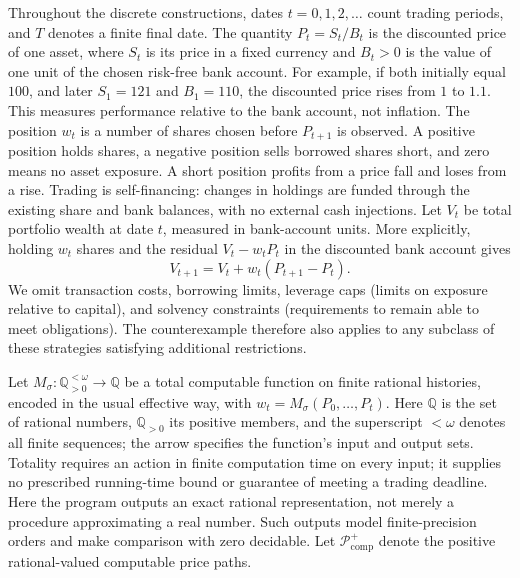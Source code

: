 \documentclass[aps,pra,reprint,superscriptaddress,amsmath,amssymb,floatfix]{revtex4-2}
\theoremstyle{plain}
\theoremstyle{definition}
\theoremstyle{remark}
\begin{document}
Throughout the discrete constructions, dates \(t=0,1,2,\ldots\) count trading
periods, and \(T\) denotes a finite final date. The quantity \(P_t=S_t/B_t\) is the discounted
price of one asset, where \(S_t\) is its price in a fixed currency and
\(B_t>0\) is the value of one unit of the chosen risk-free bank account.
For example, if both initially equal \(100\), and later \(S_1=121\) and
\(B_1=110\), the discounted price rises from \(1\) to \(1.1\).
This measures performance relative to the bank account, not inflation.
The position \(w_t\) is a number of shares chosen before \(P_{t+1}\) is
observed. A positive position holds shares, a negative position sells borrowed
shares short, and zero means no asset exposure. A short position profits from
a price fall and loses from a rise. Trading is self-financing: changes in holdings are funded through
the existing share and bank balances, with no external cash injections.
Let \(V_t\) be total portfolio wealth at date \(t\), measured in bank-account
units. More explicitly, holding \(w_t\) shares and the residual
\(V_t-w_tP_t\) in the discounted bank account gives
\[
  V_{t+1}=V_t+w_t(P_{t+1}-P_t).
\]
We omit transaction costs, borrowing limits, leverage caps (limits on exposure
relative to capital), and solvency constraints (requirements to remain able to
meet obligations). The counterexample therefore also applies to any subclass of
these strategies satisfying additional restrictions.

Let
\(M_\sigma\colon\mathbb Q_{>0}^{<\omega}\to\mathbb Q\)
be a total computable function on finite rational histories, encoded in the
usual effective way, with \(w_t=M_\sigma(P_0,\ldots,P_t)\).
Here \(\mathbb Q\) is the set of rational numbers, \(\mathbb Q_{>0}\) its
positive members, and the superscript \(<\omega\) denotes all finite
sequences; the arrow specifies the function's input and output sets.
Totality requires an
action in finite computation time on every input; it supplies no prescribed
running-time bound or guarantee of meeting a trading deadline. Here the program outputs an exact rational representation, not merely a
procedure approximating a real number. Such outputs model finite-precision
orders and make comparison with zero decidable. Let \(\mathcal P_{\mathrm{comp}}^{+}\) denote the positive
rational-valued computable price paths.
\end{document}
